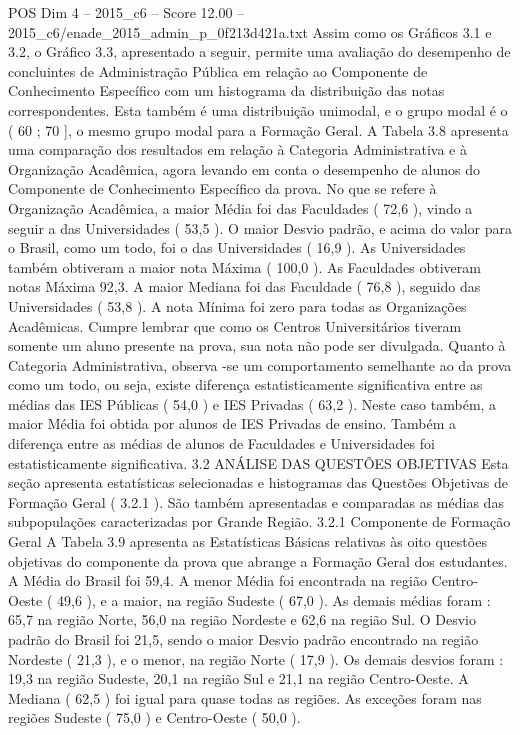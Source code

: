\begin{textsample}{POS Dim 4 – 2015\_c6 – Score 12.00 – 2015\_c6/enade\_2015\_admin\_p\_0f213d421a.txt}
Assim como os Gráficos 3.1 e 3.2, o Gráfico 3.3, apresentado a seguir, permite uma avaliação do desempenho de concluintes de Administração Pública em relação ao Componente de Conhecimento Específico com um histograma da distribuição das notas correspondentes.
Esta também é uma distribuição unimodal, e o grupo modal é o ( 60 ; 70 ], o mesmo grupo modal para a Formação Geral.
A Tabela 3.8 apresenta uma comparação dos resultados em relação à Categoria Administrativa e à Organização Acadêmica, agora levando em conta o desempenho de alunos do Componente de Conhecimento Específico da prova.
No que se refere à Organização Acadêmica, a maior Média foi das Faculdades ( 72,6 ), vindo a seguir a das Universidades ( 53,5 ).
O maior Desvio padrão, e acima do valor para o Brasil, como um todo, foi o das Universidades ( 16,9 ).
As Universidades também obtiveram a maior nota Máxima ( 100,0 ).
As Faculdades obtiveram notas Máxima 92,3.
A maior Mediana foi das Faculdade ( 76,8 ), seguido das Universidades ( 53,8 ).
A nota Mínima foi zero para todas as Organizações Acadêmicas.
Cumpre lembrar que como os Centros Universitários tiveram somente um aluno presente na prova, sua nota não pode ser divulgada.
Quanto à Categoria Administrativa, observa -se um comportamento semelhante ao da prova como um todo, ou seja, existe diferença estatisticamente significativa entre as médias das IES Públicas ( 54,0 ) e IES Privadas ( 63,2 ).
Neste caso também, a maior Média foi obtida por alunos de IES Privadas de ensino.
Também a diferença entre as médias de alunos de Faculdades e Universidades foi estatisticamente significativa. 3.2 ANÁLISE DAS QUESTÕES OBJETIVAS Esta seção apresenta estatísticas selecionadas e histogramas das Questões Objetivas de Formação Geral ( 3.2.1 ).
São também apresentadas e comparadas as médias das subpopulações caracterizadas por Grande Região. 3.2.1 Componente de Formação Geral A Tabela 3.9 apresenta as Estatísticas Básicas relativas às oito questões objetivas do componente da prova que abrange a Formação Geral dos estudantes.
A Média do Brasil foi 59,4.
A menor Média foi encontrada na região Centro-Oeste ( 49,6 ), e a maior, na região Sudeste ( 67,0 ).
As demais médias foram : 65,7 na região Norte, 56,0 na região Nordeste e 62,6 na região Sul.
O Desvio padrão do Brasil foi 21,5, sendo o maior Desvio padrão encontrado na região Nordeste ( 21,3 ), e o menor, na região Norte ( 17,9 ).
Os demais desvios foram : 19,3 na região Sudeste, 20,1 na região Sul e 21,1 na região Centro-Oeste.
A Mediana ( 62,5 ) foi igual para quase todas as regiões.
As exceções foram nas regiões Sudeste ( 75,0 ) e Centro-Oeste ( 50,0 ).

\end{textsample}
